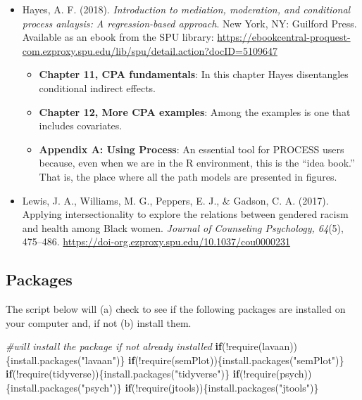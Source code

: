 \documentclass[
]{book}
\newenvironment{Shaded}{\begin{snugshade}}{\end{snugshade}}
\newcommand{\CommentTok}[1]{\textcolor[rgb]{0.56,0.35,0.01}{\textit{#1}}}
\newcommand{\ControlFlowTok}[1]{\textcolor[rgb]{0.13,0.29,0.53}{\textbf{#1}}}
\newcommand{\FunctionTok}[1]{\textcolor[rgb]{0.00,0.00,0.00}{#1}}
\newcommand{\NormalTok}[1]{#1}
\newcommand{\SpecialCharTok}[1]{\textcolor[rgb]{0.00,0.00,0.00}{#1}}
\newcommand{\StringTok}[1]{\textcolor[rgb]{0.31,0.60,0.02}{#1}}
\providecommand{\tightlist}{%
  \setlength{\itemsep}{0pt}\setlength{\parskip}{0pt}}
\begin{document}
\begin{itemize}
\tightlist
\item
  Hayes, A. F. (2018). \emph{Introduction to mediation, moderation, and conditional process anlaysis: A regression-based approach}. New York, NY: Guilford Press. Available as an ebook from the SPU library: \url{https://ebookcentral-proquest-com.ezproxy.spu.edu/lib/spu/detail.action?docID=5109647}

  \begin{itemize}
  \tightlist
  \item
    \textbf{Chapter 11, CPA fundamentals}: In this chapter Hayes disentangles conditional indirect effects.
  \item
    \textbf{Chapter 12, More CPA examples}: Among the examples is one that includes covariates.\\
  \item
    \textbf{Appendix A: Using Process}: An essential tool for PROCESS users because, even when we are in the R environment, this is the ``idea book.'' That is, the place where all the path models are presented in figures.
  \end{itemize}
\item
  Lewis, J. A., Williams, M. G., Peppers, E. J., \& Gadson, C. A. (2017). Applying intersectionality to explore the relations between gendered racism and health among Black women. \emph{Journal of Counseling Psychology, 64}(5), 475--486. \url{https://doi-org.ezproxy.spu.edu/10.1037/cou0000231}
\end{itemize}

\hypertarget{packages-8}{%
\subsection{Packages}\label{packages-8}}

The script below will (a) check to see if the following packages are installed on your computer and, if not (b) install them.

\begin{Shaded}
\begin{Highlighting}[]
\CommentTok{\#will install the package if not already installed}
\ControlFlowTok{if}\NormalTok{(}\SpecialCharTok{!}\FunctionTok{require}\NormalTok{(lavaan))\{}\FunctionTok{install.packages}\NormalTok{(}\StringTok{"lavaan"}\NormalTok{)\}}
\ControlFlowTok{if}\NormalTok{(}\SpecialCharTok{!}\FunctionTok{require}\NormalTok{(semPlot))\{}\FunctionTok{install.packages}\NormalTok{(}\StringTok{"semPlot"}\NormalTok{)\}}
\ControlFlowTok{if}\NormalTok{(}\SpecialCharTok{!}\FunctionTok{require}\NormalTok{(tidyverse))\{}\FunctionTok{install.packages}\NormalTok{(}\StringTok{"tidyverse"}\NormalTok{)\}}
\ControlFlowTok{if}\NormalTok{(}\SpecialCharTok{!}\FunctionTok{require}\NormalTok{(psych))\{}\FunctionTok{install.packages}\NormalTok{(}\StringTok{"psych"}\NormalTok{)\}}
\ControlFlowTok{if}\NormalTok{(}\SpecialCharTok{!}\FunctionTok{require}\NormalTok{(jtools))\{}\FunctionTok{install.packages}\NormalTok{(}\StringTok{"jtools"}\NormalTok{)\}}
\end{Highlighting}
\end{Shaded}
\end{document}
